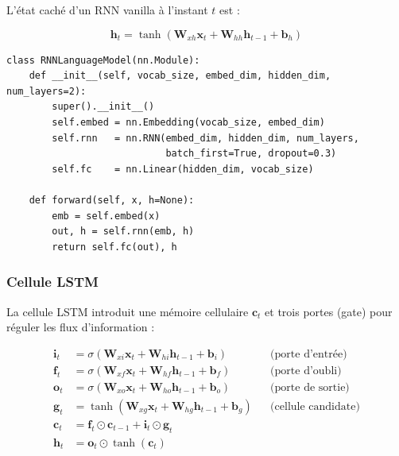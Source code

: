 \documentclass[11pt,a4paper]{article}
\begin{document}
L'état caché d'un RNN vanilla à l'instant $t$ est :

\begin{equation}
  \mathbf{h}_t = \tanh(\mathbf{W}_{xh}\mathbf{x}_t + \mathbf{W}_{hh}\mathbf{h}_{t-1} + \mathbf{b}_h)
  \label{eq:rnn_cell}
\end{equation}

\begin{lstlisting}[caption={RNN de modélisation de langage avec PyTorch.},
                   label={lst:rnn_lm}]
class RNNLanguageModel(nn.Module):
    def __init__(self, vocab_size, embed_dim, hidden_dim, num_layers=2):
        super().__init__()
        self.embed = nn.Embedding(vocab_size, embed_dim)
        self.rnn   = nn.RNN(embed_dim, hidden_dim, num_layers,
                            batch_first=True, dropout=0.3)
        self.fc    = nn.Linear(hidden_dim, vocab_size)

    def forward(self, x, h=None):
        emb = self.embed(x)
        out, h = self.rnn(emb, h)
        return self.fc(out), h
\end{lstlisting}

\subsubsection{Cellule LSTM}

La cellule LSTM \cite{hochreiter1997long} introduit une mémoire cellulaire $\mathbf{c}_t$
et trois portes (gate) pour réguler les flux d'information :

\begin{align}
  \mathbf{i}_t &= \sigma(\mathbf{W}_{xi}\mathbf{x}_t + \mathbf{W}_{hi}\mathbf{h}_{t-1} + \mathbf{b}_i) && \text{(porte d'entrée)} \label{eq:lstm_input} \\
  \mathbf{f}_t &= \sigma(\mathbf{W}_{xf}\mathbf{x}_t + \mathbf{W}_{hf}\mathbf{h}_{t-1} + \mathbf{b}_f) && \text{(porte d'oubli)}  \label{eq:lstm_forget} \\
  \mathbf{o}_t &= \sigma(\mathbf{W}_{xo}\mathbf{x}_t + \mathbf{W}_{ho}\mathbf{h}_{t-1} + \mathbf{b}_o) && \text{(porte de sortie)} \label{eq:lstm_output} \\
  \mathbf{g}_t &= \tanh(\mathbf{W}_{xg}\mathbf{x}_t + \mathbf{W}_{hg}\mathbf{h}_{t-1} + \mathbf{b}_g) && \text{(cellule candidate)} \label{eq:lstm_cell} \\
  \mathbf{c}_t &= \mathbf{f}_t \odot \mathbf{c}_{t-1} + \mathbf{i}_t \odot \mathbf{g}_t \label{eq:lstm_state} \\
  \mathbf{h}_t &= \mathbf{o}_t \odot \tanh(\mathbf{c}_t) \label{eq:lstm_hidden}
\end{align}
\end{document}
